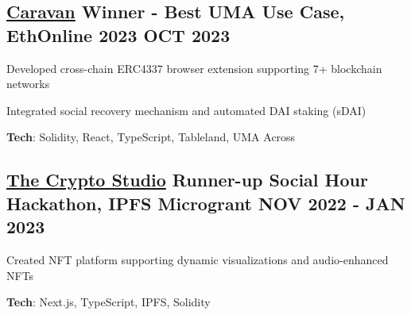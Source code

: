 \documentclass[letter,10pt]{article}
\begin{document}
\subsection{{ \href{https://github.com/0xabh/caravan}{Caravan} Winner - Best UMA Use Case, EthOnline 2023 \hfill OCT 2023}}
\begin{zitemize}
  \item Developed cross-chain ERC4337 browser extension supporting 7+ blockchain networks
  \item Integrated social recovery mechanism and automated DAI staking (sDAI)
  \item \textbf{Tech}: Solidity, React, TypeScript, Tableland, UMA Across
\end{zitemize}

\subsection{{ \href{https://github.com/Suhel-Kap/the-crypto-studio}{The Crypto Studio} Runner-up Social Hour Hackathon, IPFS Microgrant \hfill NOV 2022 - JAN 2023}}
\begin{zitemize}
  \item Created NFT platform supporting dynamic visualizations and audio-enhanced NFTs
  \item \textbf{Tech}: Next.js, TypeScript, IPFS, Solidity
\end{zitemize}
\end{document}
